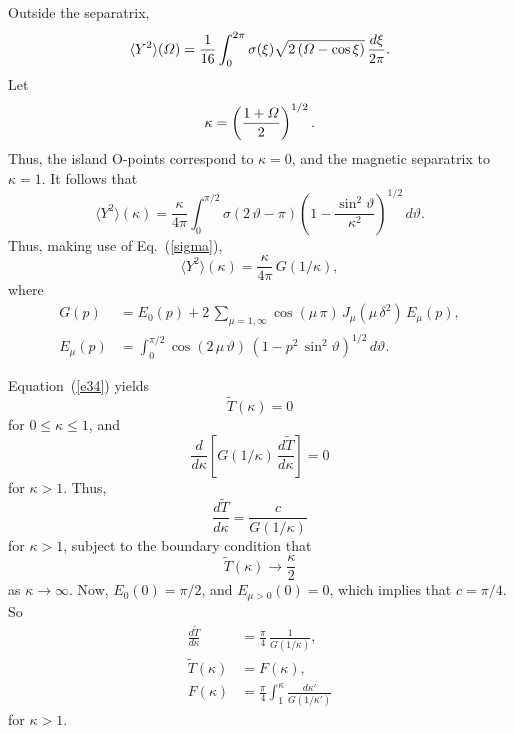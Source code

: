 \documentclass[12pt,prb,aps]{revtex4-1}
\begin{document}
Outside the separatrix,
\begin{equation}
\langle Y^2\rangle({\mit\Omega}) = \frac{1}{16}\int_0^{2\pi}\sigma(\xi)\sqrt{2\,({\mit\Omega}-\cos\xi)}\,\frac{d\xi}{2\pi}.
\end{equation}
Let 
\begin{equation}\label{kappa}
\kappa= \left(\frac{1+{\mit\Omega}}{2}\right)^{1/2}.
\end{equation}
Thus, the island O-points correspond to $\kappa=0$, and the magnetic separatrix to $\kappa=1$. 
It follows that 
\begin{equation}
\langle Y^2\rangle(\kappa) = \frac{\kappa}{4\pi}\int_0^{\pi/2}\sigma(2\,\vartheta-\pi)\left(1-\frac{\sin^2\vartheta}{\kappa^2}\right)^{1/2}\,d\vartheta.
\end{equation}
Thus, making use of Eq.~(\ref{sigma}), 
\begin{equation}
\langle Y^2\rangle(\kappa) = \frac{\kappa}{4\pi}\,G(1/\kappa),
\end{equation}
where
\begin{align}
G(p) &=E_0(p) +2\,\sum_{\mu=1,\infty}\cos(\mu\,\pi)\,J_\mu(\mu\,\delta^2)\,E_\mu(p),\\[0.5ex]
E_\mu(p) &= \int_0^{\pi/2} \cos(2\,\mu\,\vartheta)\,(1-p^2\,\sin^2\vartheta)^{1/2}\,d\vartheta.
\end{align}

Equation~(\ref{e34}) yields
\begin{equation}
\tilde{T}(\kappa) = 0
\end{equation}
for $0\leq\kappa\leq 1$, and 
\begin{equation}
\frac{d}{d\kappa}\!\left[G(1/\kappa)\,\frac{d\tilde{T}}{d\kappa}\right]=0
\end{equation}
for $\kappa>1$. Thus,
\begin{equation}
\frac{d\tilde{T}}{d\kappa} = \frac{c}{G(1/\kappa)}
\end{equation}
for $\kappa>1$, subject to the boundary condition that
\begin{equation}
\tilde{T}(\kappa)\rightarrow \frac{\kappa}{2}
\end{equation}
as $\kappa\rightarrow \infty$. Now, $E_0(0) = \pi/2$, and  $E_{\mu>0}(0) = 0$,
which implies that $c=\pi/4$. So
\begin{align}\label{e47x}
\frac{d\tilde{T}}{d\kappa} &= \frac{\pi}{4}\,\frac{1}{G(1/\kappa)},\\[0.5ex]
\tilde{T}(\kappa) &= F(\kappa),\label{e48}\\[0.5ex]
F(\kappa) &= \frac{\pi}{4}\int_1^\kappa\frac{d\kappa'}{G(1/\kappa')}
\end{align}
for $\kappa>1$. 
\end{document}
